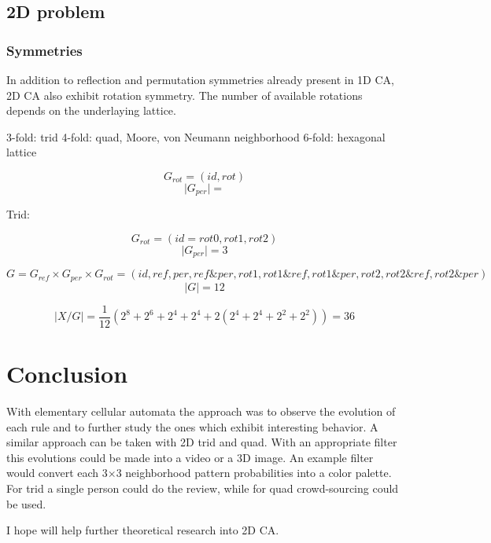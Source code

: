 \documentclass{ijuc}
\begin{document}
\subsection{2D problem}

\subsubsection{Symmetries}

In addition to reflection and permutation symmetries already present in 1D CA,
2D CA also exhibit rotation symmetry. The number of available rotations depends
on the underlaying lattice.

3-fold: trid
4-fold: quad, Moore, von Neumann neighborhood
6-fold: hexagonal lattice

\[ G_{rot} = (id, rot) \]
\[ \vert G_{per} \vert =  \]

Trid:

\[ G_{rot} = (id=rot0, rot1, rot2) \]
\[ \vert G_{per} \vert = 3 \]

\[ G = G_{ref} \times G_{per} \times G_{rot} = (id, ref, per, ref \& per, rot1, rot1 \& ref, rot1 \& per, rot2, rot2 \& ref, rot2 \& per) \]
\[ \vert G \vert = 12 \]

\[ |X/G| = \frac{1}{12} (2^8 + 2^6 + 2^4 + 2^4 + 2 (2^4 + 2^4 + 2^2 + 2^2)) = 36 \]

\section{Conclusion}

With elementary cellular automata the approach was to observe the evolution of
each rule and to further study the ones which exhibit interesting behavior.
A similar approach can be taken with 2D trid and quad. With an appropriate filter
this evolutions could be made into a video or a 3D image. An example filter would
convert each 3×3 neighborhood pattern probabilities into a color palette. For trid
a single person could do the review, while for quad crowd-sourcing could be used.

I hope will help further theoretical research into 2D CA.



\appendix 
\end{document}
